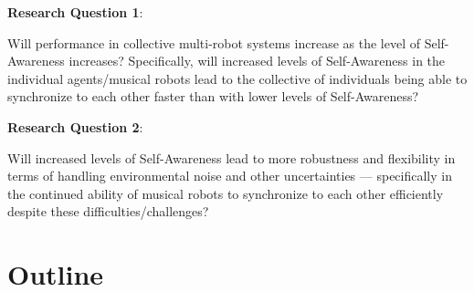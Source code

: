 	\textbf{Research Question 1}:
	
	Will performance in collective multi-robot systems increase as the level of Self-Awareness increases? Specifically, will increased levels of Self-Awareness in the individual agents/musical robots lead to the collective of individuals being able to synchronize to each other faster than with lower levels of Self-Awareness? \nl
	
	\textbf{Research Question 2}:
	
	Will increased levels of Self-Awareness lead to more robustness and flexibility in terms of handling environmental noise and other uncertainties — specifically in the continued ability of musical robots to synchronize to each other efficiently despite these difficulties/challenges? \nl
	
	
	
	
	
	
	
	\section{Outline}
	
